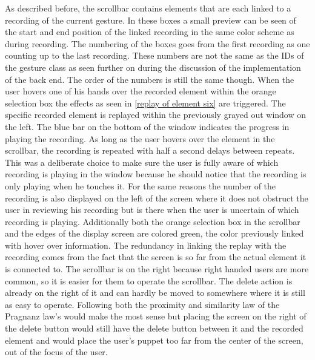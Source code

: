 As described before, the scrollbar contains elements that are each linked to a recording of the current gesture. In these boxes a small preview can be seen of the start and end position of the linked recording in the same color scheme as during recording. The numbering of the boxes goes from the first recording as one counting up to the last recording. These numbers are not the same as the IDs of the gesture class as seen further on during the discussion of the implementation of the back end. The order of the numbers is still the same though. When the user hovers one of his hands over the recorded element within the orange selection box the effects as seen in \ref{replay of element six} are triggered. The specific recorded element is replayed within the previously grayed out window on the left. The blue bar on the bottom of the window indicates the progress in playing the recording. As long as the user hovers over the element in the scrollbar, the recording is repeated with half a second delays between repeats. This was a deliberate choice to make sure the user is fully aware of which recording is playing in the window because he should notice that the recording is only playing when he touches it. For the same reasons the number of the recording is also displayed on the left of the screen where it does not obstruct the user in reviewing his recording but is there when the user is uncertain of which recording is playing. Additionally both the orange selection box in the scrollbar and the edges of the display screen are colored green, the color previously linked with hover over information. The redundancy in linking the replay with the recording comes from the fact that the screen is so far from the actual element it is connected to. The scrollbar is on the right because right handed users are more common, so it is easier for them to operate the scrollbar. The delete action is already on the right of it and can hardly be moved to somewhere where it is still as easy to operate. Following both the proximity and similarity law of the Pragnanz law's would make the most sense but placing the screen on the right of the delete button would still have the delete button between it and the recorded element and would place the user's puppet too far from the center of the screen, out of the focus of the user.\\

